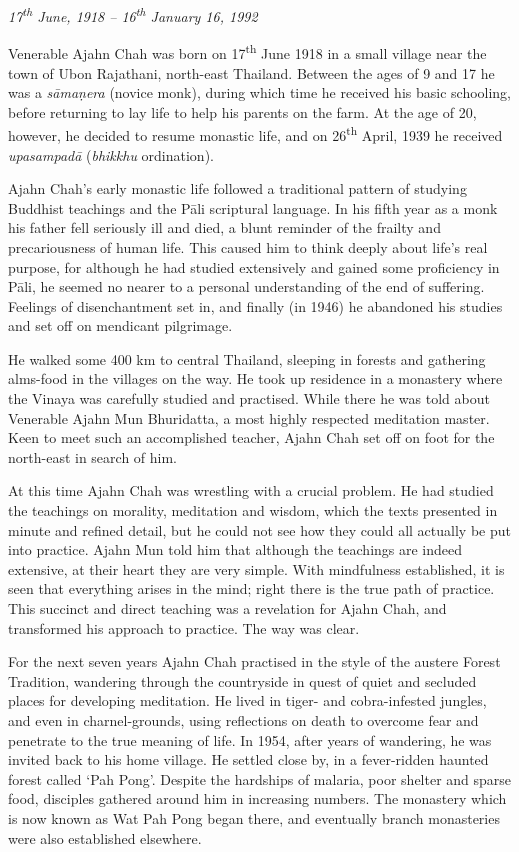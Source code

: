 
\noindent
\emph{17\textsuperscript{th} June, 1918 -- 16\textsuperscript{th} January 16, 1992}

\bigskip
\noindent
Venerable Ajahn Chah was born on 17\textsuperscript{th} June 1918 in a small village near
the town of Ubon Rajathani, north-east Thailand. Between the ages of 9
and 17 he was a \emph{sāmaṇera} (novice monk), during which time he
received his basic schooling, before returning to lay life to help his
parents on the farm. At the age of 20, however, he decided to resume
monastic life, and on 26\textsuperscript{th} April, 1939 he received \emph{upasampadā}
(\emph{bhikkhu} ordination).

Ajahn Chah's early monastic life followed a traditional pattern of
studying Buddhist teachings and the Pāli scriptural language. In his
fifth year as a monk his father fell seriously ill and died, a blunt reminder of
the frailty and precariousness of human life. This caused him to think
deeply about life's real purpose, for although he had studied
extensively and gained some proficiency in Pāli, he seemed no nearer to
a personal understanding of the end of suffering. Feelings of
disenchantment set in, and finally (in 1946) he abandoned his studies
and set off on mendicant pilgrimage. 

He walked some 400 km to central Thailand, sleeping in forests and
gathering alms-food in the villages on the way. He took up residence in a
monastery where the Vinaya was carefully studied and practised. While
there he was told about Venerable Ajahn Mun Bhuridatta, a most highly
respected meditation master. Keen to meet such an accomplished teacher, 
Ajahn Chah set off on foot for the north-east in search of him. 

At this time Ajahn Chah was wrestling with a crucial problem. He had
studied the teachings on morality, meditation and wisdom, which the
texts presented in minute and refined detail, but he could not see how
they could all actually be put into practice. Ajahn Mun told him that
although the teachings are indeed extensive, at their heart they are
very simple. With mindfulness established, it is seen that everything
arises in the mind; right there is the true path of practice. This
succinct and direct teaching was a revelation for Ajahn Chah, and
transformed his approach to practice. The way was clear. 

For the next seven years Ajahn Chah practised in the style of the
austere Forest Tradition, wandering through the countryside in quest of
quiet and secluded places for developing meditation. He lived in tiger-
and cobra-infested jungles, and even in charnel-grounds, using
reflections on death to overcome fear and penetrate to the true meaning
of life. In 1954, after years of wandering, he was invited back to his
home village. He settled close by, in a fever-ridden haunted forest
called `Pah Pong'. Despite the hardships of malaria, poor shelter and
sparse food, disciples gathered around him in increasing numbers. The
monastery which is now known as Wat Pah Pong began there, and eventually
branch monasteries were also established elsewhere. 

